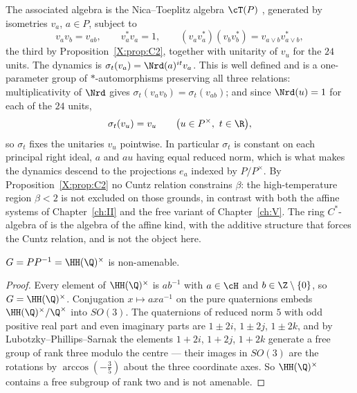 \begin{remark}\label{X:rem:relations}
The associated algebra is the Nica--Toeplitz algebra $\cT(P)$ \cite{Nica,LacaRaeburn},
generated by isometries $v_a$, $a\in P$, subject to
\[
v_av_b=v_{ab},\qquad v_a^*v_a=1,\qquad (v_av_a^*)(v_bv_b^*)=v_{a\vee b}v_{a\vee b}^*,
\]
the third by Proposition~\ref{X:prop:C2}, together with unitarity of $v_u$ for the $24$ units.
The dynamics is $\sigma_t(v_a)=\Nrd(a)^{it}v_a$. This is well defined and is a one-parameter
group of $*$-automorphisms preserving all three relations: multiplicativity of $\Nrd$ gives
$\sigma_t(v_av_b)=\sigma_t(v_{ab})$; and since $\Nrd(u)=1$ for each of the $24$ units,
\[
\sigma_t(v_u)=v_u\qquad\bigl(u\in P^\times,\ t\in\R\bigr),
\]
so $\sigma_t$ fixes the unitaries $v_u$ pointwise. In particular $\sigma_t$ is constant on
each principal right ideal, $a$ and $au$ having equal reduced norm, which is what makes the
dynamics descend to the projections $e_a$ indexed by $P/P^\times$. By
Proposition~\ref{X:prop:C2} no Cuntz relation constrains $\beta$: the
high-temperature region $\beta<2$ is not excluded on those grounds, in contrast with both the
affine systems of Chapter~\ref{ch:II} and the free variant of Chapter~\ref{ch:V}. The ring $C^*$-algebra of
\cite{CL} is the algebra of the affine kind, with the additive structure that forces the
Cuntz relation, and is not the object here.
\end{remark}

\begin{proposition}\label{X:prop:nonamen}
$G=PP^{-1}=\HH(\Q)^\times$ is non-amenable.
\end{proposition}

\begin{proof}
Every element of $\HH(\Q)^\times$ is $ab^{-1}$ with $a\in\cH$ and $b\in\Z\setminus\{0\}$, so
$G=\HH(\Q)^\times$. Conjugation $x\mapsto axa^{-1}$ on the pure quaternions embeds
$\HH(\Q)^\times/\Q^\times$ into $SO(3)$. The quaternions of reduced norm $5$ with odd
positive real part and even imaginary parts are $1\pm2i$, $1\pm2j$, $1\pm2k$, and by
Lubotzky--Phillips--Sarnak \cite[\S3]{LPS} the elements $1+2i$, $1+2j$, $1+2k$ generate a
free group of rank three modulo the centre --- their images in $SO(3)$ are the rotations by
$\arccos(-\frac35)$ about the three coordinate axes. So $\HH(\Q)^\times$ contains a free
subgroup of rank two and is not amenable.
\end{proof}

